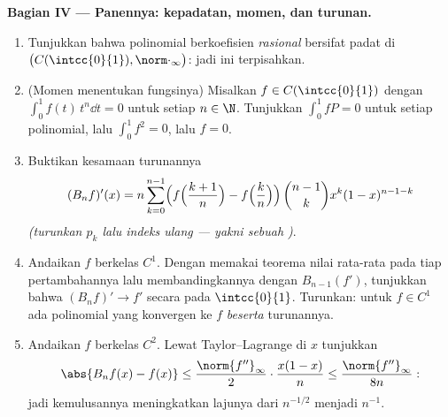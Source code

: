 \begin{problem}
\medskip
\noindent\textbf{Bagian IV --- Panennya: kepadatan, momen, dan
turunan.}
\begin{enumerate}[resume]
  \item Tunjukkan bahwa polinomial berkoefisien \emph{rasional}
        bersifat padat di $\bigl(C(\intcc{0}{1}),
        \norm\cdot_\infty\bigr)$: jadi  ini
        terpisahkan.
  \item (Momen menentukan fungsinya) Misalkan $f \in
        C(\intcc{0}{1})$ dengan $\int_0^1 f(t)\,t^n \dd t = 0$
        untuk setiap $n \in \N$. Tunjukkan $\int_0^1 f P = 0$ untuk
        setiap polinomial, lalu $\int_0^1 f^2 = 0$, lalu $f = 0$.
  \item Buktikan kesamaan turunannya
        \[
        (B_nf)'(x) = n\sum_{k=0}^{n-1}\Bigl(
        f\Bigl(\frac{k+1}{n}\Bigr) -
        f\Bigl(\frac kn\Bigr)\Bigr)\,
        \binom{n-1}{k}x^k(1-x)^{n-1-k}
        \]
        \emph{(turunkan $p_k$ lalu indeks ulang --- yakni sebuah
        )}.
  \item Andaikan $f$ berkelas $C^1$. Dengan memakai teorema nilai
        rata-rata pada tiap pertambahannya lalu membandingkannya dengan
        $B_{n-1}(f')$, tunjukkan bahwa $(B_nf)' \to f'$ secara 
        pada $\intcc{0}{1}$. Turunkan: untuk $f \in C^1$ ada polinomial
        yang konvergen ke $f$ \emph{beserta} turunannya.
  \item Andaikan $f$ berkelas $C^2$. Lewat Taylor--Lagrange di $x$
        tunjukkan
        \[
        \abs{B_nf(x) - f(x)} \leq
        \frac{\norm{f''}_\infty}{2}\cdot\frac{x(1-x)}{n}
        \leq \frac{\norm{f''}_\infty}{8n} :
        \]
        jadi kemulusannya meningkatkan lajunya dari $n^{-1/2}$ menjadi
        $n^{-1}$.
\end{enumerate}


\end{problem}
